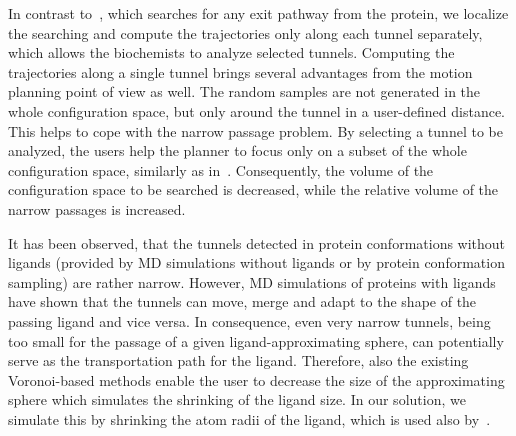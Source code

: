 \documentclass{bmcart}
\begin{document}

In contrast to~\cite{cortes2010simulating}, which searches for any exit pathway from the protein, we localize the searching and compute the trajectories only along each tunnel separately, which allows the biochemists to analyze selected tunnels.
Computing the trajectories along a single tunnel brings several advantages from the motion planning point of view as well.
The random samples are not generated in the whole configuration space, but only around the tunnel in a user-defined distance. 
This helps to cope with the narrow passage problem.
By selecting a tunnel to be analyzed, the users help the planner to focus only on a subset of the whole configuration
space, similarly as in~\cite{denny2018general}.
Consequently, the volume of the configuration space to be searched is decreased, while the relative volume of the narrow passages is increased.

It has been observed, that the tunnels detected in protein conformations without ligands (provided by MD simulations without ligands or by
protein conformation sampling) are rather narrow. 
However, MD simulations of proteins with ligands have shown that the tunnels can move, merge and adapt to the shape of the passing ligand and vice versa.
In consequence, even very narrow tunnels, being too small for the passage of a given ligand-approximating sphere, can potentially serve as the transportation path for the ligand.
Therefore, also the existing Voronoi-based methods enable the user to decrease the size of the approximating sphere which simulates the shrinking of the ligand size.
In our solution, we simulate this by shrinking the atom radii of the ligand, which is used also by~\cite{cortes2010simulating,guieysse2008structure}.

%
\end{document}
